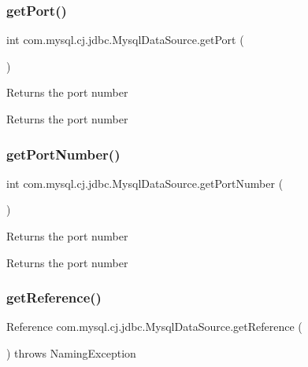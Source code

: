 \subsubsection{\texorpdfstring{get\+Port()}{getPort()}}
{\footnotesize\ttfamily int com.\+mysql.\+cj.\+jdbc.\+Mysql\+Data\+Source.\+get\+Port (\begin{DoxyParamCaption}{ }\end{DoxyParamCaption})}

Returns the port number

\begin{DoxyReturn}{Returns}
the port number 
\end{DoxyReturn}
\mbox{\label{classcom_1_1mysql_1_1cj_1_1jdbc_1_1_mysql_data_source_a59aae6b9598f9021a0c676f237ddf465}} 
\subsubsection{\texorpdfstring{get\+Port\+Number()}{getPortNumber()}}
{\footnotesize\ttfamily int com.\+mysql.\+cj.\+jdbc.\+Mysql\+Data\+Source.\+get\+Port\+Number (\begin{DoxyParamCaption}{ }\end{DoxyParamCaption})}

Returns the port number

\begin{DoxyReturn}{Returns}
the port number 
\end{DoxyReturn}
\mbox{\label{classcom_1_1mysql_1_1cj_1_1jdbc_1_1_mysql_data_source_a6acbbcd3dfbb948cf5231d2bd0a58928}} 
\subsubsection{\texorpdfstring{get\+Reference()}{getReference()}}
{\footnotesize\ttfamily Reference com.\+mysql.\+cj.\+jdbc.\+Mysql\+Data\+Source.\+get\+Reference (\begin{DoxyParamCaption}{ }\end{DoxyParamCaption}) throws Naming\+Exception}

